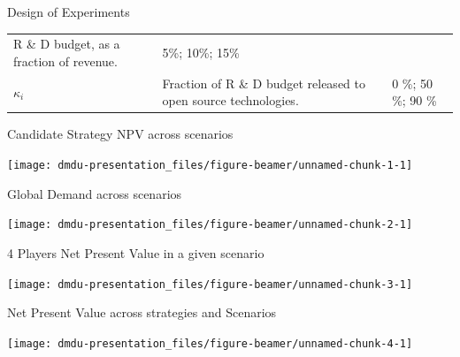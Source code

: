\documentclass[12pt,ignorenonframetext,]{beamer}
\begin{document}
\begin{frame}{Design of Experiments}
\begin{longtable}[]{@{}lll@{}}
\begin{minipage}[t]{0.47\columnwidth}
R \& D budget, as a fraction of revenue.\strut
\end{minipage} & \begin{minipage}[t]{0.30\columnwidth}\raggedright\strut
5\%; 10\%; 15\%\strut
\end{minipage}\tabularnewline
\begin{minipage}[t]{0.14\columnwidth}\raggedright\strut
\(\kappa_i\)\strut
\end{minipage} & \begin{minipage}[t]{0.47\columnwidth}\raggedright\strut
Fraction of R \& D budget released to open source technologies.\strut
\end{minipage} & \begin{minipage}[t]{0.30\columnwidth}\raggedright\strut
0 \%; 50 \%; 90 \%\strut
\end{minipage}\tabularnewline
\bottomrule
\end{longtable}

\end{frame}

\begin{frame}{Candidate Strategy NPV across scenarios}

\begin{center}\texttt{[image: dmdu-presentation\_files/figure-beamer/unnamed-chunk-1-1]} \end{center}

\end{frame}

\begin{frame}{Global Demand across scenarios}

\begin{center}\texttt{[image: dmdu-presentation\_files/figure-beamer/unnamed-chunk-2-1]} \end{center}

\end{frame}

\begin{frame}{4 Players Net Present Value in a given scenario}

\begin{center}\texttt{[image: dmdu-presentation\_files/figure-beamer/unnamed-chunk-3-1]} \end{center}

\end{frame}

\begin{frame}{Net Present Value across strategies and Scenarios}

\begin{center}\texttt{[image: dmdu-presentation\_files/figure-beamer/unnamed-chunk-4-1]} \end{center}

\end{frame}
\end{document}
